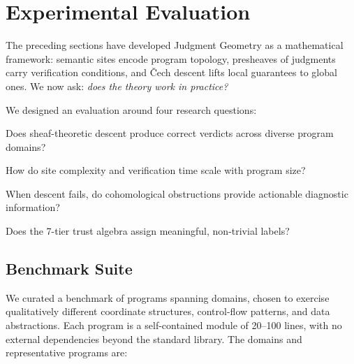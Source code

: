 
\section{Experimental Evaluation}\label{sec:evaluation}

The preceding sections have developed Judgment Geometry as a
mathematical framework: semantic sites encode program topology,
presheaves of judgments carry verification conditions, and
\v{C}ech descent lifts local guarantees to global ones.
We now ask: \emph{does the theory work in practice?}

We designed an evaluation around four research questions:
\begin{description}[leftmargin=2em,style=nextline]
\item[RQ1 (Correctness).]
  Does sheaf-theoretic descent produce correct verdicts across diverse
  program domains?
\item[RQ2 (Scalability).]
  How do site complexity and verification time scale with program size?
\item[RQ3 (Obstruction quality).]
  When descent fails, do cohomological obstructions provide actionable
  diagnostic information?
\item[RQ4 (Trust fidelity).]
  Does the 7-tier trust algebra assign meaningful, non-trivial labels?
\end{description}

\subsection{Benchmark Suite}\label{sec:benchmark}

We curated a benchmark of \expTotalPrograms{} \Python{} programs
spanning \expDomainCount{} domains, chosen to exercise qualitatively
different coordinate structures, control-flow patterns, and data
abstractions.  Each program is a self-contained module of 20--100
lines, with no external dependencies beyond the \Python{} standard
library.  The domains and representative programs are:

